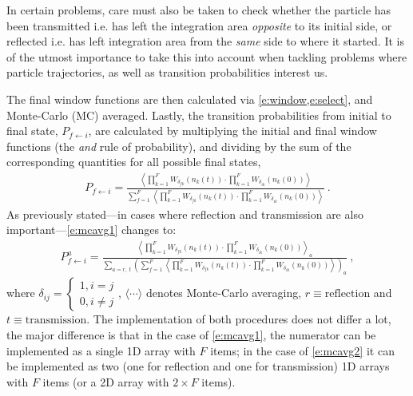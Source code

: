 In certain problems, care must also be taken to check whether the particle has been transmitted i.e. has left the integration area \emph{opposite} to its initial side, or reflected i.e. has left integration area from the \emph{same} side to where it started. It is of the utmost importance to take this into account when tackling problems where particle trajectories, as well as transition probabilities interest us.

The final window functions are then calculated via \cref{e:window,e:select}, and Monte-Carlo (MC) averaged. Lastly, the transition probabilities from initial to final state, $ P_{f \leftarrow i} $, are calculated by multiplying the initial and final window functions (the \emph{and} rule of probability), and dividing by the sum of the corresponding quantities for all possible final states,
\begin{align}\label{e:mcavg1}
P_{f \leftarrow i} = \frac{\left\langle \prod\limits_{k=1}^{F} W_{\delta_{fk}}(n_{k}(t)) \cdot \prod\limits_{k=1}^{F} W_{\delta_{ik}}(n_{k}(0)) \right\rangle}{\sum\limits_{f=1}^{F} \left\langle \prod\limits_{k=1}^{F} W_{\delta_{fk}}(n_{k}(t)) \cdot \prod\limits_{k=1}^{F} W_{\delta_{ik}}(n_{k}(0)) \right\rangle}~.
\end{align}
As previously stated---in cases where reflection and transmission are also important---\cref{e:mcavg1} changes to:
\begin{align}\label{e:mcavg2}
P_{f \leftarrow i}^{a} = \frac{\left\langle \prod\limits_{k=1}^{F} W_{\delta_{fk}}(n_{k}(t)) \cdot \prod\limits_{k=1}^{F} W_{\delta_{ik}}(n_{k}(0)) \right\rangle_{a}}{\sum\limits_{a = r,~t} \left( \sum\limits_{f=1}^{F} \left\langle \prod\limits_{k=1}^{F} W_{\delta_{fk}}(n_{k}(t)) \cdot \prod\limits_{k=1}^{F} W_{\delta_{ik}}(n_{k}(0)) \right\rangle\right)_{a}}~,
\end{align}
where $ \delta_{ij} = \begin{cases}1, i = j\\ 0, i \neq j\end{cases} $, $ \langle \cdots \rangle $ denotes Monte-Carlo averaging, $ r \equiv \text{reflection} $ and $ t \equiv \text{transmission} $. The implementation of both procedures does not differ a lot, the major difference is that in the case of \cref{e:mcavg1}, the numerator can be implemented as a single 1D array with $ F $ items; in the case of \cref{e:mcavg2} it can be implemented as two (one for reflection and one for transmission) 1D arrays with $ F $ items (or a 2D array with $ 2\times F $ items).

